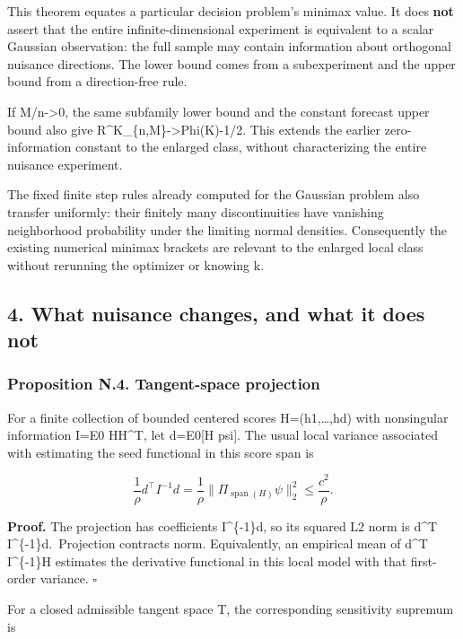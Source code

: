This theorem equates a particular decision problem's minimax value. It
does \textbf{not} assert that the entire infinite-dimensional experiment
is equivalent to a scalar Gaussian observation: the full sample may
contain information about orthogonal nuisance directions. The lower
bound comes from a subexperiment and the upper bound from a
direction-free rule.

If M/n-\textgreater0, the same subfamily lower bound and the constant
forecast upper bound also give R\^{}K\_\{n,M\}-\textgreater Phi(K)-1/2.
This extends the earlier zero-information constant to the enlarged
class, without characterizing the entire nuisance experiment.

The fixed finite step rules already computed for the Gaussian problem
also transfer uniformly: their finitely many discontinuities have
vanishing neighborhood probability under the limiting normal densities.
Consequently the existing numerical minimax brackets are relevant to the
enlarged local class without rerunning the optimizer or knowing k.

\subsection{4. What nuisance changes, and what it does
not}\label{what-nuisance-changes-and-what-it-does-not}

\subsubsection{Proposition N.4. Tangent-space
projection}\label{proposition-n.4.-tangent-space-projection}

For a finite collection of bounded centered scores H=(h1,\ldots,hd) with
nonsingular information I=E0 HH\^{}T, let d=E0{[}H psi{]}. The usual
local variance associated with estimating the seed functional in this
score span is

\[
\frac1\rho d^\top I^{-1}d
=\frac1\rho\|\Pi_{\operatorname{span}(H)}\psi\|_2^2
\le\frac{c^2}{\rho}.
\tag{N.12}
\]

\textbf{Proof.} The projection has coefficients I\^{}\{-1\}d, so its
squared L2 norm is d\^{}T I\^{}\{-1\}d.~Projection contracts norm.
Equivalently, an empirical mean of d\^{}T I\^{}\{-1\}H estimates the
derivative functional in this local model with that first-order
variance. \(\square\)

For a closed admissible tangent space T, the corresponding sensitivity
supremum is

